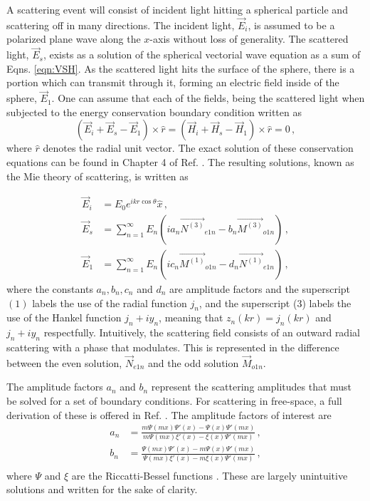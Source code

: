 A scattering event will consist of incident light hitting a spherical particle and scattering off in many directions. The incident light, $\vec{E}_i$, is assumed to be a polarized plane wave along the $x$-axis without loss of generality. The scattered light, $\vec{E}_s$, exists as a solution of the spherical vectorial wave equation as a sum of Eqns. \ref{eqn:VSH}. As the scattered light hits the surface of the sphere, there is a portion which can transmit through it, forming an electric field inside of the sphere, $\vec{E}_1$.  One can assume that each of the fields, being the scattered light when subjected to the energy conservation boundary condition written as
\begin{equation}
    (\vec E_i + \vec E_s - \vec E_1) \times \hat r = (\vec H_i + \vec H_s - \vec H_1) \times \hat r = 0\,,
\end{equation}
where $\hat{r}$ denotes the radial unit vector. The exact solution of these conservation equations can be found in Chapter 4 of Ref. \cite{bohren1983absorption}. The resulting solutions, known as the Mie theory of scattering, is written as 

\begin{equation}\label{eqn:lorenzmie}
    \begin{aligned}
     \vec E_i &= E_0 e^{ikr\cos \theta}\hat x\,,\\    
     \vec E_s &= \sum_{n=1}^\infty E_n(i a_n \vec{N^{(3)}}_{e1n} - b_n \vec{M^{(3)}}_{o1n})\,,\\
     \vec E_1 &= \sum_{n=1}^\infty E_n(i c_n \vec{M^{(1)}}_{o1n} - d_n \vec{N^{(1)}}_{e1n})\,,    
    \end{aligned}
\end{equation}
where the constants $a_n, b_n, c_n$ and $d_n$ are amplitude factors and the superscript $(1)$ labels the use of the radial function $j_n$, and the superscript (3) labels the use of the Hankel function $j_n + iy_n$, meaning that $z_n(kr) = j_n(kr)$ and $j_n + iy_n$ respectfully. Intuitively, the scattering field consists of an outward radial scattering with a phase that modulates. This is represented in the difference between the even solution, $\vec{N}_{e1n}$ and the odd solution $\vec{M}_{o1n}$. 

The amplitude factors $a_n$ and $b_n$ represent the scattering amplitudes that must be solved for a set of boundary conditions. For scattering in free-space, a full derivation of these is offered in Ref. \cite{bohren1983absorption}. The amplitude factors of interest are
\begin{equation}
    \begin{aligned}
        a_n &= \frac{m\Psi(mx)\Psi'(x) - \Psi(x)\Psi'(mx)}{m\Psi(mx)\xi'(x) -\xi(x) \Psi'(mx)}\,,\\
        b_n &= \frac{\Psi(mx)\Psi'(x) - m\Psi(x)\Psi'(mx)}{\Psi(mx)\xi'(x) - m \xi(x) \Psi'(mx)}\,,\\
    \end{aligned}
\end{equation}
where $\Psi$ and $\xi$ are the Riccatti-Bessel functions \cite{bohren1983absorption}. These are largely unintuitive solutions and written for the sake of clarity. 

